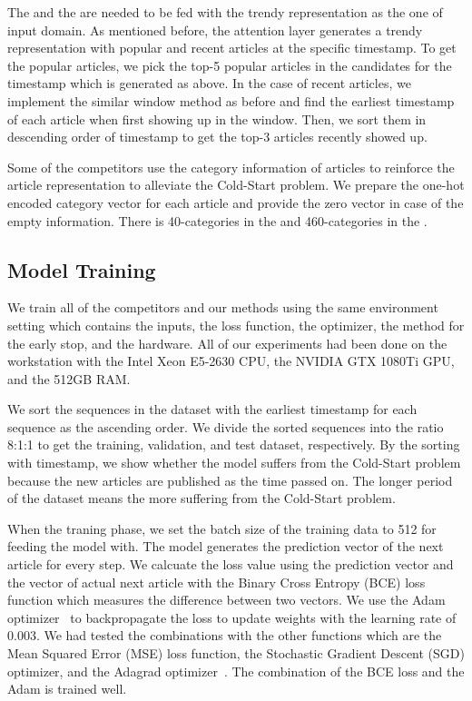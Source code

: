 The \lstmcat and the \method are needed to be fed with the trendy representation as the one of input domain.
As mentioned before, the attention layer generates a trendy representation with popular and recent articles at the specific timestamp.
To get the popular articles, we pick the top-5 popular articles in the candidates for the timestamp which is generated as above.
In the case of recent articles, we implement the similar window method as before and find the earliest timestamp of each article when first showing up in the window.
Then, we sort them in descending order of timestamp to get the top-3 articles recently showed up.

Some of the competitors use the category information of articles to reinforce the article representation to alleviate the Cold-Start problem.
We prepare the one-hot encoded category vector for each article and provide the zero vector in case of the empty information.
There is 40-categories in the \dataAdressa and 460-categories in the \dataGloboName.


\subsection{Model Training}
\label{sec:exp:training}
We train all of the competitors and our methods using the same environment setting which contains the inputs, the loss function, the optimizer, the method for the early stop, and the hardware.
All of our experiments had been done on the workstation with the Intel Xeon E5-2630 CPU, the NVIDIA GTX 1080Ti GPU, and the 512GB RAM.

We sort the sequences in the dataset with the earliest timestamp for each sequence as the ascending order.
We divide the sorted sequences into the ratio 8:1:1 to get the training, validation, and test dataset, respectively.
By the sorting with timestamp, we show whether the model suffers from the Cold-Start problem because the new articles are published as the time passed on.
The longer period of the dataset means the more suffering from the Cold-Start problem.

When the traning phase, we set the batch size of the training data to 512 for feeding the model with.
The model generates the prediction vector of the next article for every step.
We calcuate the loss value using the prediction vector and the vector of actual next article with the Binary Cross Entropy (BCE) loss function which measures the difference between two vectors.
We use the Adam optimizer~\cite{Adam} to backpropagate the loss to update weights with the learning rate of 0.003.
We had tested the combinations with the other functions which are the Mean Squared Error (MSE) loss function, the Stochastic Gradient Descent (SGD) optimizer, and the Adagrad optimizer~\cite{AdaGrad}.
The combination of the BCE loss and the Adam is trained well.

